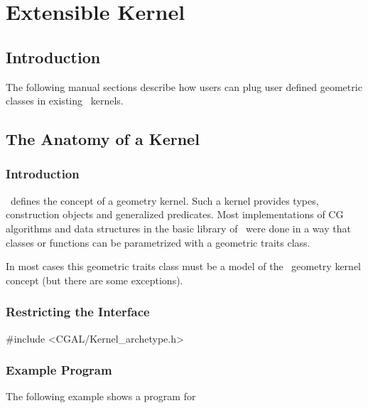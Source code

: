 \chapter{Extensible Kernel}

\section{Introduction}

The following manual sections describe how users can plug user defined
geometric classes in existing \cgal\ kernels.

\section{The Anatomy of a Kernel}

\subsection{Introduction}

\cgal\ defines the concept of a geometry kernel. Such a kernel provides types,
construction objects and generalized predicates. Most implementations of CG
algorithms and data structures in the basic library of \cgal\ were done in a way
that classes or functions can be parametrized with a geometric traits class. 

In most cases this geometric traits class must be a model of the \cgal\ geometry
kernel concept (but there are some exceptions).



\subsection{Restricting the Interface}



\ccHtmlLinksOff

\begin{ccExampleCode}
#include <CGAL/Kernel_archetype.h>
\end{ccExampleCode}

\ccHtmlLinksOn


\subsection{Example Program}

The following example shows a program for 

\ccHtmlLinksOff

